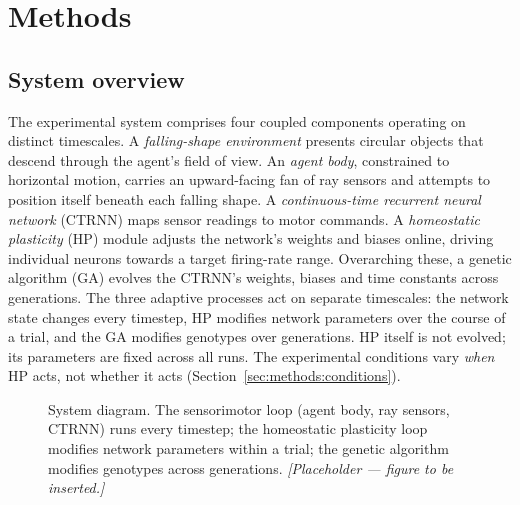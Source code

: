 %
%

\section{Methods}
\label{sec:methods}

\subsection{System overview}
\label{sec:methods:overview}

The experimental system comprises four coupled components operating on
distinct timescales. A \emph{falling-shape environment} presents circular
objects that descend through the agent's field of view. An \emph{agent body},
constrained to horizontal motion, carries an upward-facing fan of ray sensors
and attempts to position itself beneath each falling shape. A
\emph{continuous-time recurrent neural network} (CTRNN) maps sensor readings to
motor commands. A \emph{homeostatic plasticity} (HP) module adjusts the
network's weights and biases online, driving individual neurons towards a
target firing-rate range. Overarching these, a genetic algorithm (GA) evolves
the CTRNN's weights, biases and time constants across generations. The three
adaptive processes act on separate timescales: the network state changes every
timestep, HP modifies network parameters over the course of a trial, and the GA
modifies genotypes over generations. HP itself is not evolved; its parameters
are fixed across all runs. The experimental conditions vary \emph{when} HP acts,
not whether it acts (Section~\ref{sec:methods:conditions}).

\begin{figure}[t]
  \centering
  \caption{System diagram. The sensorimotor loop (agent body, ray sensors,
  CTRNN) runs every timestep; the homeostatic plasticity loop modifies network
  parameters within a trial; the genetic algorithm modifies genotypes across
  generations. \emph{[Placeholder --- figure to be inserted.]}}
  \label{fig:system}
\end{figure}

